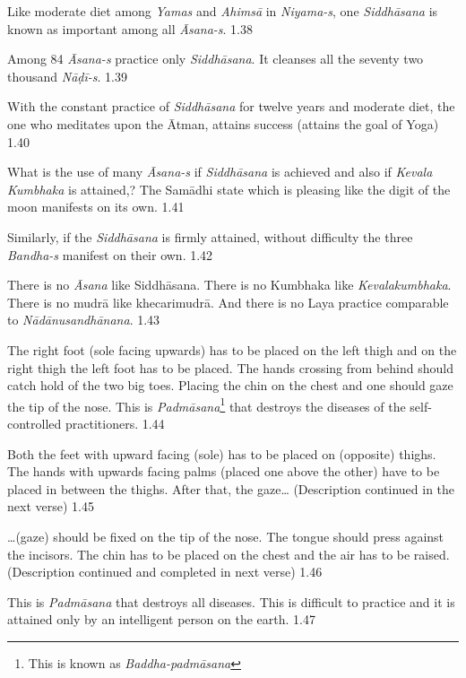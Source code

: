 
Like moderate diet  among \textit{Yamas} and \textit{Ahimsā} in \textit{Niyama-s}, one \textit{Siddhāsana} is known as important among all \textit{Āsana-s}.  1.38

Among 84 \textit{Āsana-s} practice only \textit{Siddhāsana}. It cleanses all the seventy two thousand \textit{Nāḍī-s}.  1.39

With the constant practice of \textit{Siddhāsana} for twelve years and moderate diet, the one who meditates upon the Ātman,  attains success (attains the goal of Yoga) 1.40

What is the use of many \textit{Āsana-s} if \textit{Siddhāsana} is achieved and also if \textit{Kevala Kumbhaka} is attained,? The Samādhi state which is pleasing like the digit of the moon manifests on its own. 1.41

Similarly, if the \textit{Siddhāsana} is firmly attained, without difficulty the three \textit{Bandha-s} manifest on their own.   1.42

There is no \textit{Āsana} like Siddhāsana. There is no Kumbhaka like \textit{Kevalakumbhaka}. There is no mudrā like khecarimudrā. And there is no Laya practice comparable to \textit{Nādānusandhānana}. 1.43
\medskip


The right foot (sole facing upwards) has to be placed on the left thigh and on the right thigh the left foot has to be placed. The hands crossing from behind should catch hold of the two big toes. Placing the chin on the chest and one should gaze the tip of the nose. This is \textit{Padmāsana}\footnote{This is known as \textit{Baddha-padmāsana}} that destroys the diseases of the self-controlled practitioners. 1.44


Both the feet with upward facing (sole) has to be placed on (opposite) thighs. The hands with upwards facing palms (placed one above the other) have to be placed in between the thighs. After that, the gaze… (Description continued in the next verse) 1.45

…(gaze) should be fixed on the tip of the nose. The tongue should press against the incisors. The chin has to be placed on the chest and the air has to be raised. (Description continued and completed in next verse) 1.46

This is \textit{Padmāsana} that destroys all diseases. This is difficult to practice and it is attained only by an intelligent person on the earth.  1.47


